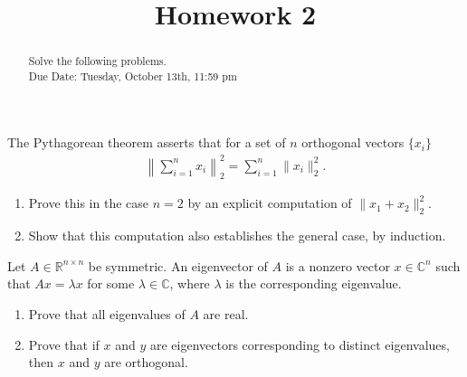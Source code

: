 \documentclass{ximera}
\begin{document}
    \title{Homework 2}
    
    \begin{abstract} Solve the following problems.
    \\
    Due Date: Tuesday, October 13th, 11:59 pm
    \end{abstract}
    \maketitle


\begin{exercise}
    The Pythagorean theorem asserts that for a set of $n$ orthogonal vectors $\{x_i\}$
    \begin{align*}
        \left\|\sum\limits_{i=1}^n x_i\right\|_2^2 = \sum\limits_{i=1}^n \|x_i\|_2^2.
    \end{align*}
    \begin{enumerate}
        \item Prove this in the case $n=2$ by an explicit computation of $\|x_1+x_2\|_2^2$.
        \item Show that this computation also establishes the general case, by induction.
    \end{enumerate}
\end{exercise}

\begin{exercise}
    Let $A \in \mathbb{R}^{n\times n}$ be symmetric. An eigenvector of $A$ is a nonzero vector $x \in \mathbb{C}^n$ such that $Ax = \lambda x$ for some $\lambda \in \mathbb{C}$, where $\lambda$ is the corresponding eigenvalue.
    \begin{enumerate}
        \item Prove that all eigenvalues of $A$ are real.
        \item Prove that if $x$ and $y$ are eigenvectors corresponding to distinct eigenvalues, then $x$ and $y$ are orthogonal.
    \end{enumerate}
\end{exercise}
\end{document}
